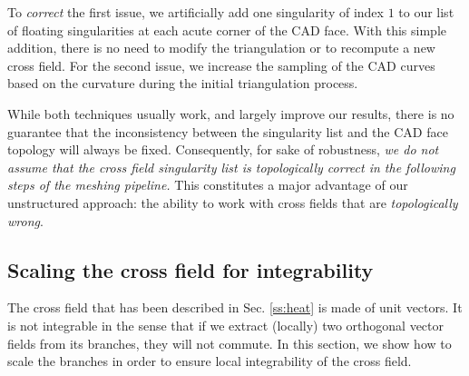 \documentclass[AMA,STIX1COL]{WileyNJD-v2}
\newcommand\rsec[1]{Sec. \ref{#1}}
\begin{document}
{To \emph{correct} the first issue, we artificially add one singularity of index
$1$ to our list of floating singularities at each acute corner of the CAD face.
With this simple addition, there is no need to modify the triangulation or to
recompute a new cross field.  For the second issue, we increase the
sampling of the CAD curves based on the curvature during the initial
triangulation process.

While both techniques usually work, and largely improve our results, there is
no guarantee that the inconsistency between the singularity list and the CAD
face topology will always be fixed. Consequently, for sake of
robustness, \emph{
  we do not assume that the cross field singularity list is
  topologically correct  in the following steps of the meshing
pipeline.} This constitutes a major advantage of our unstructured approach: the ability
to work with cross fields that are \emph{topologically wrong}.


\subsection{Scaling the cross field for integrability}
\label{ss:scaling}

The cross field that has been described in \rsec{ss:heat} is made of unit
vectors. It is not integrable in the sense that if we extract (locally) two
orthogonal vector fields from its branches, they will not commute.  In this
section, we show how to scale the branches in order to ensure local
integrability of the cross field.

}
\end{document}
